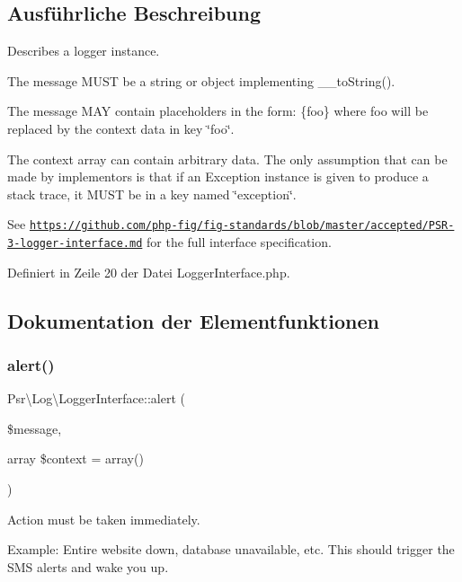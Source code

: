 \subsection{Ausführliche Beschreibung}
Describes a logger instance.

The message M\+U\+ST be a string or object implementing \+\_\+\+\_\+to\+String().

The message M\+AY contain placeholders in the form\+: \{foo\} where foo will be replaced by the context data in key \char`\"{}foo\char`\"{}.

The context array can contain arbitrary data. The only assumption that can be made by implementors is that if an Exception instance is given to produce a stack trace, it M\+U\+ST be in a key named \char`\"{}exception\char`\"{}.

See \href{https://github.com/php-fig/fig-standards/blob/master/accepted/PSR-3-logger-interface.md}{\tt https\+://github.\+com/php-\/fig/fig-\/standards/blob/master/accepted/\+P\+S\+R-\/3-\/logger-\/interface.\+md} for the full interface specification. 

Definiert in Zeile 20 der Datei Logger\+Interface.\+php.



\subsection{Dokumentation der Elementfunktionen}
\mbox{\label{interface_psr_1_1_log_1_1_logger_interface_a957d0328d4e0ebc013b8df027148d2bf}} 
\subsubsection{\texorpdfstring{alert()}{alert()}}
{\footnotesize\ttfamily Psr\textbackslash{}\+Log\textbackslash{}\+Logger\+Interface\+::alert (\begin{DoxyParamCaption}\item[{}]{\$message,  }\item[{array}]{\$context = {\ttfamily array()} }\end{DoxyParamCaption})}

Action must be taken immediately.

Example\+: Entire website down, database unavailable, etc. This should trigger the S\+MS alerts and wake you up.


